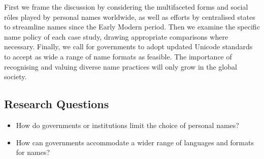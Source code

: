 First we frame the discussion by considering the multifaceted forms and social
rôles played by personal names worldwide, as well as efforts by centralised
states to streamline names since the Early Modern period. Then we examine the
specific name policy of each case study, drawing appropriate comparisons where
necessary. Finally, we call for governments to adopt updated Unicode standards
to accept as wide a range of name formats as feasible. The importance of
recognising and valuing diverse name practices will only grow in the global
society.

\subsection{Research Questions}

\begin{itemize}
\item How do governments or institutions limit the choice of personal names?
\item How can governments accommodate a wider range of languages and formats for
	names?
\end{itemize}
